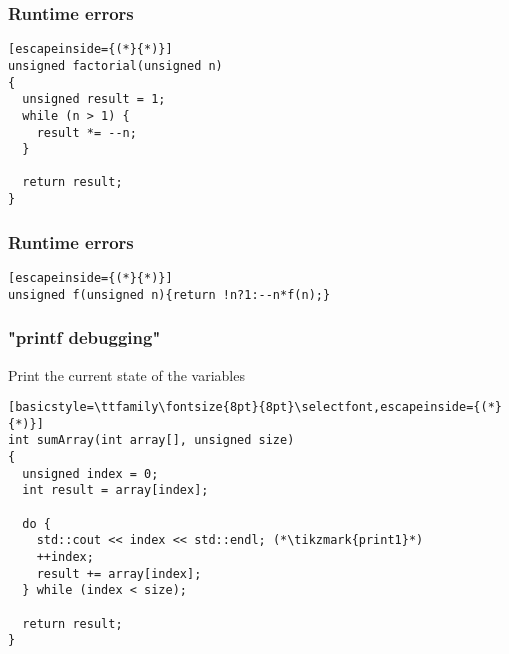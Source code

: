 \documentclass[14pt,a4paper,dvipsnames,usenames]{beamer}
\begin{document}
\begin{frame}[fragile]
  \frametitle{Runtime errors}

  \begin{lstlisting}[escapeinside={(*}{*)}]
unsigned factorial(unsigned n)
{
  unsigned result = 1;
  while (n > 1) {
    result *= --n;
  }

  return result;
}
  \end{lstlisting}
  
\end{frame}

\begin{frame}[fragile]
  \frametitle{Runtime errors}

  \begin{lstlisting}[escapeinside={(*}{*)}]
unsigned f(unsigned n){return !n?1:--n*f(n);}
  \end{lstlisting}
  
\end{frame}

\begin{frame}[fragile]
  \frametitle{"printf debugging"}

  Print the current state of the variables

  \hspace{1em}
  \begin{lstlisting}[basicstyle=\ttfamily\fontsize{8pt}{8pt}\selectfont,escapeinside={(*}{*)}]
int sumArray(int array[], unsigned size)
{
  unsigned index = 0;
  int result = array[index];

  do {
    std::cout << index << std::endl; (*\tikzmark{print1}*)
    ++index;
    result += array[index];
  } while (index < size);

  return result;
}
  \end{lstlisting}

  \nointerlineskip
  
\end{frame}
\end{document}
